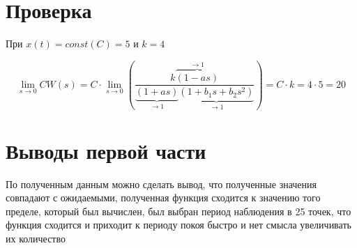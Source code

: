 \documentclass[a4paper, 12pt]{article}
\begin{document}
\newpage

\section{Проверка}

При $x(t) = const (C) = 5$ и $k = 4$

$$
    \lim_{s\to0}CW(s) = C \cdot \lim_{s\to0}\left(\dfrac{k\overbrace{(1-as)}^{\to1}}{\underbrace{(1+as)}_{\to1}\underbrace{(1+b_1s+b_2s^2)}_{\to1}}\right) = C \cdot k = 4 \cdot 5 = 20
$$

\section{Выводы первой части}
По полученным данным можно сделать вывод, что полученные значения совпадают с ожидаемыми, полученная функция сходится к значению того пределе, который был вычислен, был выбран период наблюдения в 25 точек, что функция сходится и приходит к периоду покоя быстро и нет смысла увеличивать их количество
\end{document}
